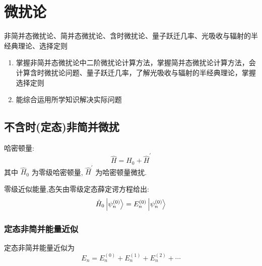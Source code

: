 \documentclass[12pt, a4paper, oneside, UTF8]{ctexbook}
\begin{document}
% 
\else
\fi

\chapter{微扰论}
\begin{examct}{}{}
    非简并态微扰论、简并态微扰论、含时微扰论、量子跃迁几率、光吸收与辐射的半经典理论、选择定则
\end{examct}
\begin{examrqm}{}{}
    \begin{enumerate}
        \item 掌握非简并态微扰论中二阶微扰论计算方法，掌握简并态微扰论计算方法，会计算含时微扰论问题、量子跃迁几率，了解光吸收与辐射的半经典理论，掌握选择定则
        \item 能综合运用所学知识解决实际问题
    \end{enumerate}
\end{examrqm}

\section{不含时(定态)非简并微扰}

哈密顿量:
\begin{equation}
    \hat{H} = \hat{H}_0+\hat{H}^{\prime}
\end{equation}
其中 $\hat{H}_0$ 为零级哈密顿量, $\hat{H}^{\prime}$ 为哈密顿量微扰.

零级近似能量,态矢由零级定态薛定谔方程给出:
\begin{equation}
    \hat{H}_0\ket{\psi_n^{(0)}}=E_n^{(0)}\ket{\psi_n^{(0)}}
\end{equation}
\subsection{定态非简并能量近似}
定态非简并能量近似为
\begin{equation}
    E_n = E_n^{(0)}+E_n^{(1)}+E_n^{(2)}+\cdots 
\end{equation}
\end{document}
